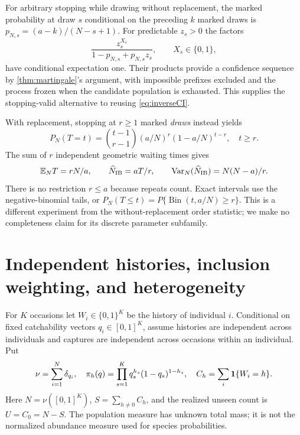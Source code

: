 \documentclass[11pt]{article}
\theoremstyle{remark}\newtheorem{remark}[theorem]{Remark}
\newcommand{\E}{\mathbb E}\newcommand{\PP}{\mathbb P}
\newcommand{\Var}{\operatorname{Var}}\newcommand{\Cov}{\operatorname{Cov}}
\begin{document}
For arbitrary stopping while drawing without replacement, the marked
probability at draw $s$ conditional on the preceding $k$ marked draws is
$p_{N,s}=(a-k)/(N-s+1)$. For predictable $z_s>0$ the factors
\[
 \frac{z_s^{X_s}}{1-p_{N,s}+p_{N,s}z_s},\qquad X_s\in\{0,1\},
\]
have conditional expectation one. Their products provide a confidence
sequence by \cref{thm:martingale}'s argument, with impossible prefixes
excluded and the process frozen when the candidate population is exhausted.
This supplies the stopping-valid alternative to reusing \eqref{eq:inverseCI}.

With replacement, stopping at $r\ge1$ marked \emph{draws} instead yields
\[
 P_N(T=t)=\binom{t-1}{r-1}(a/N)^r(1-a/N)^{t-r},\quad t\ge r.
\]
The sum of $r$ independent geometric waiting times gives
\[
 \E_N T=rN/a,\qquad \widehat N_{\rm IB}=aT/r,
 \qquad\Var_N(\widehat N_{\rm IB})=N(N-a)/r.
\]
There is no restriction $r\le a$ because repeats count. Exact intervals use
the negative-binomial tails, or
$P_N(T\le t)=P\{\operatorname{Bin}(t,a/N)\ge r\}$.
This is a different experiment from the without-replacement order statistic;
we make no completeness claim for its discrete parameter subfamily.

\section{Independent histories, inclusion weighting, and heterogeneity}
For $K$ occasions let $W_i\in\{0,1\}^K$ be the history of individual $i$.
Conditional on fixed catchability vectors $q_i\in[0,1]^K$, assume histories
are independent across individuals and captures are independent across
occasions within an individual. Put
\[
 \nu=\sum_{i=1}^N\delta_{q_i},\quad
 \pi_h(q)=\prod_{s=1}^K q_s^{h_s}(1-q_s)^{1-h_s},\quad
 C_h=\sum_i\mathbf1\{W_i=h\}.
\]
Here $N=\nu([0,1]^K)$, $S=\sum_{h\ne0}C_h$, and the realized unseen count
is $U=C_0=N-S$. The population measure has unknown total mass; it is not
the normalized abundance measure used for species probabilities.
\end{document}
